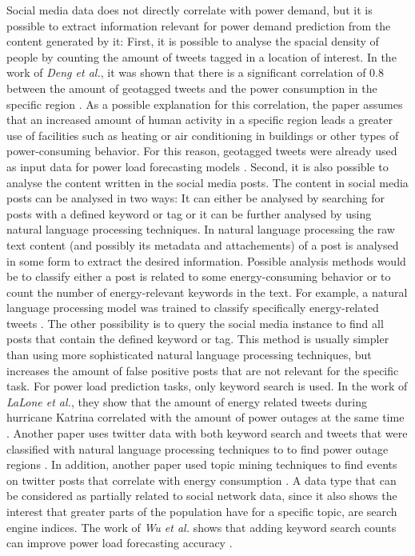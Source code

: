 Social media data does not directly correlate with power demand, but it is
possible to extract information relevant for power demand prediction
from the content generated by it:
First, it is possible to analyse the spacial density of people by 
counting the amount of tweets tagged in a location of interest. 
In the work of \textit{Deng et al.},
it was shown that there is a significant
correlation of 0.8 between the amount of geotagged tweets
and the power consumption in the specific region \cite{twittergeoloccorr}.
As a possible explanation for this correlation, the paper assumes that 
an increased amount of human activity in a specific region leads a greater 
use of facilities such as heating or air conditioning in buildings or 
other types of power-consuming behavior.
For this reason, geotagged tweets were already used as input data for 
power load forecasting models 
\cite{twittergeolocforecasting} \cite{twittergeolocforecasting2}.
Second, it is also possible to analyse the content written in the 
social media posts. The content in social media posts can be 
analysed in two ways: 
It can either be analysed by searching for posts with a defined keyword or tag
or it can be further analysed by using natural language processing techniques. 
In natural language processing the raw text content 
(and possibly its metadata and attachements) of a post is analysed
in some form to extract the desired information. Possible analysis
methods would be to classify either a post is related to some energy-consuming
behavior or to count the number of energy-relevant keywords in the text.
For example, a natural language processing model was trained to 
classify specifically energy-related tweets \cite{energybert}.
The other possibility is to query the social media instance 
to find all posts that contain the defined keyword or tag.
This method is usually simpler than using more sophisticated natural 
language processing techniques, but increases the amount of false positive 
posts that are not relevant for the specific task.
For power load prediction tasks, only keyword search is used.
In the work of \textit{LaLone et al.}, they show that the amount of energy
related tweets during hurricane Katrina correlated with the amount of 
power outages at the same time \cite{poweroutagetwitter}.
Another paper uses twitter data with both keyword search and 
tweets that were classified with natural language processing techniques to
to find power outage regions \cite{twitterpoweroutagelighttime}.
In addition, another paper used topic mining techniques to find
events on twitter posts that correlate with energy consumption 
\cite{twittertopicevent}.
A data type that can be considered as partially related to social 
network data, since it also shows the interest that greater parts of 
the population have for a specific topic, are search engine indices.
The work of \textit{Wu et al.} shows that adding keyword search counts
can improve power load forecasting accuracy \cite{googlepowerforecast}.

